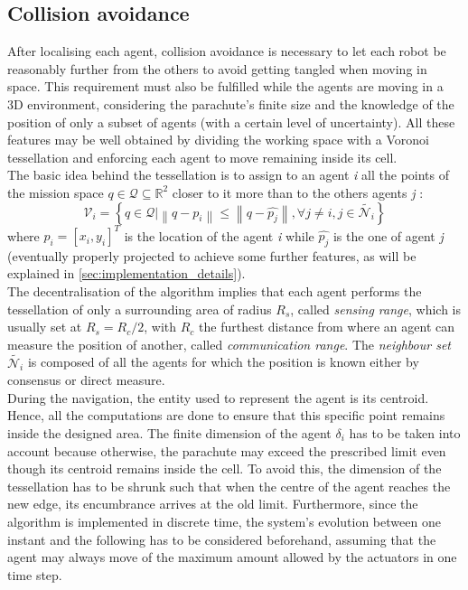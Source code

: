\subsection{Collision avoidance}
After localising each agent, collision avoidance is necessary to let each robot be reasonably further from the others to avoid getting tangled when moving in space. This requirement must also be fulfilled while the agents are moving in a 3D environment, considering the parachute's finite size and the knowledge of the position of only a subset of agents (with a certain level of uncertainty). All these features may be well obtained by dividing the working space with a Voronoi tessellation and enforcing each agent to move remaining inside its cell. \\
The basic idea behind the tessellation is to assign to an agent \textit{i} all the points of the mission space $q \in \mathcal{Q} \subseteq \mathbb{R}^2$ closer to it more than to the others agents \textit{j} \cite{b1}:
\begin{equation}
    \mathcal{V}_i = \left\{ q \in \mathcal{Q} \lvert \left\lVert q-p_i \right\rVert \leq \left\lVert q-\hat{p_j} \right\rVert, \forall j \neq i, j \in \tilde{\mathcal{N}_{i}} \right\}
\end{equation}
where $p_i=\left[x_i, y_i\right]^T$ is the location of the agent \textit{i} while $\hat{p_j}$ is the one of agent \textit{j} (eventually properly projected to achieve some further features, as will be explained in \autoref{sec:implementation_details}).\\
The decentralisation of the algorithm implies that each agent performs the tessellation of only a surrounding area of radius $R_s$, called \textit{sensing range}, which is usually set at $R_s = R_c/2$, with $R_c$ the furthest distance from where an agent can measure the position of another, called \textit{communication range}. The \textit{neighbour set} $\tilde{\mathcal{N}_{i}}$ is composed of all the agents for which the position is known either by consensus or direct measure. \\
During the navigation, the entity used to represent the agent is its centroid. Hence, all the computations are done to ensure that this specific point remains inside the designed area. The finite dimension of the agent $\delta_i$ has to be taken into account because otherwise, the parachute may exceed the prescribed limit even though its centroid remains inside the cell. To avoid this, the dimension of the tessellation has to be shrunk such that when the centre of the agent reaches the new edge, its encumbrance arrives at the old limit. Furthermore, since the algorithm is implemented in discrete time, the system's evolution between one instant and the following has to be considered beforehand, assuming that the agent may always move of the maximum amount allowed by the actuators in one time step.\\
